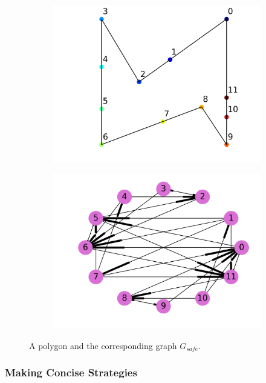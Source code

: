 \documentclass[]{styles/svproc}  %
\begin{document}
\begin{figure}
\centering
\begin{subfigure}{0.5\textwidth}
\centering
\includegraphics[width=\linewidth]{figures/simple_bit_inserted.png}
\end{subfigure}%
\begin{subfigure}{0.5\textwidth}
\centering
\includegraphics[width=\linewidth]{figures/simple_bit_safe_graph.png}
\end{subfigure}
\caption{A polygon and the corresponding graph $G_{safe}$.}
\label{fig:simple_bit}
\end{figure}

\subsubsection{Making Concise Strategies}
\end{document}
